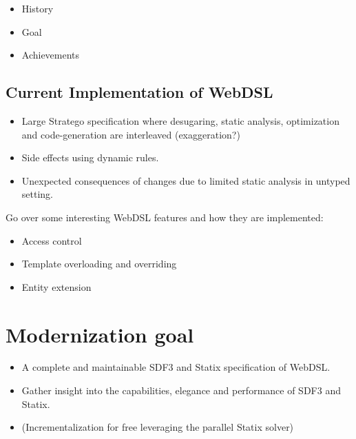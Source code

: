       \begin{itemize}
        \item History
        \item Goal
        \item Achievements
      \end{itemize}

    \subsection{\label{subsec:current-implementation}Current Implementation of WebDSL}

      \begin{itemize}
        \item Large Stratego specification where desugaring, static analysis, optimization and code-generation are interleaved (exaggeration?)
        \item Side effects using dynamic rules.
        \item Unexpected consequences of changes due to limited static analysis in untyped setting.
      \end{itemize}

      Go over some interesting WebDSL features and how they are implemented:
      \begin{itemize}
        \item Access control
        \item Template overloading and overriding
        \item Entity extension
      \end{itemize}

  \section{\label{sec:modernization}Modernization goal}

    \begin{itemize}
      \item A complete and maintainable SDF3 and Statix specification of WebDSL.
      \item Gather insight into the capabilities, elegance and performance of SDF3 and Statix.
      \item (Incrementalization for free leveraging the parallel Statix solver)
    \end{itemize}

